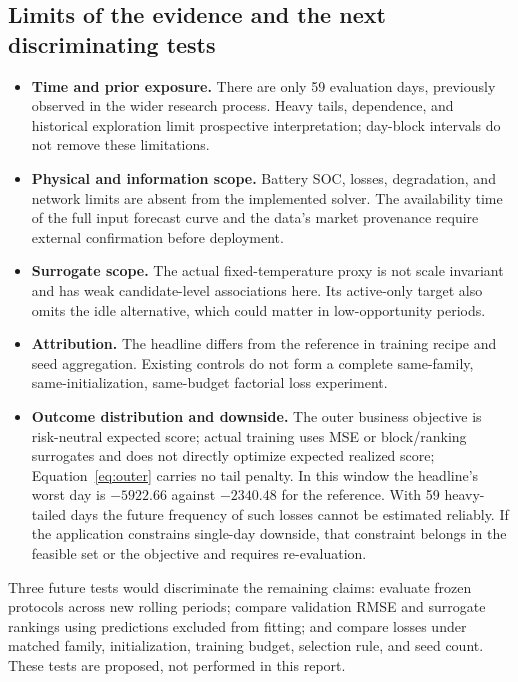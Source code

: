 \documentclass[11pt,a4paper]{article}
\begin{document}
\subsection{Limits of the evidence and the next discriminating tests}
\begin{itemize}
\item \textbf{Time and prior exposure.} There are only 59 evaluation days, previously observed in the wider research process. Heavy tails, dependence, and historical exploration limit prospective interpretation; day-block intervals do not remove these limitations.
\item \textbf{Physical and information scope.} Battery SOC, losses, degradation, and network limits are absent from the implemented solver. The availability time of the full input forecast curve and the data's market provenance require external confirmation before deployment.
\item \textbf{Surrogate scope.} The actual fixed-temperature proxy is not scale invariant and has weak candidate-level associations here. Its active-only target also omits the idle alternative, which could matter in low-opportunity periods.
\item \textbf{Attribution.} The headline differs from the reference in training recipe and seed aggregation. Existing controls do not form a complete same-family, same-initialization, same-budget factorial loss experiment.
\item \textbf{Outcome distribution and downside.} The outer business objective is risk-neutral expected score; actual training uses MSE or block/ranking surrogates and does not directly optimize expected realized score; Equation~\eqref{eq:outer} carries no tail penalty. In this window the headline's worst day is $-5922.66$ against $-2340.48$ for the reference. With 59 heavy-tailed days the future frequency of such losses cannot be estimated reliably. If the application constrains single-day downside, that constraint belongs in the feasible set or the objective and requires re-evaluation.
\end{itemize}
Three future tests would discriminate the remaining claims: evaluate frozen protocols across new rolling periods; compare validation RMSE and surrogate rankings using predictions excluded from fitting; and compare losses under matched family, initialization, training budget, selection rule, and seed count. These tests are proposed, not performed in this report.
\end{document}
